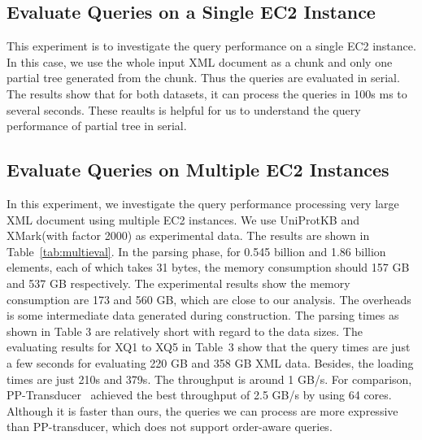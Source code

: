 \subsection{Evaluate Queries on a Single EC2 Instance}

This experiment is to investigate the query performance on a single EC2
instance. In this case, we use the whole input XML document as a chunk and only
one partial tree generated from the chunk. Thus the queries are evaluated in
serial. The results show that for both datasets, it can process the queries
in 100s ms to several seconds. These reaults is helpful for us to understand
the query performance of partial tree in serial.


\subsection{Evaluate Queries on Multiple EC2 Instances}

In this experiment, we investigate the query performance processing very large
XML document using multiple EC2 instances. We use UniProtKB and XMark(with
factor 2000) as experimental data. The results are shown in
Table~\ref{tab:multieval}. In the parsing phase, for 0.545 billion and 1.86
billion elements, each of which takes 31 bytes, the memory consumption should
157 GB and 537 GB respectively. The experimental results show the memory
consumption are 173 and 560 GB, which are close to our analysis.  The overheads
is some intermediate data generated during construction. The parsing times as
shown in Table 3 are relatively short with regard to the data sizes. The
evaluating results for XQ1 to XQ5 in Table~3 show that  the query times are just
a few seconds for evaluating 220 GB and 358 GB XML data.  Besides, the loading
times are just 210s and 379s.  The throughput is around 1 GB/s. For comparison,
PP-Transducer~\cite{OgTP13} achieved the best throughput of 2.5 GB/s by using 64
cores. Although it is faster than ours, the queries we can process are more
expressive than PP-transducer, which does not support order-aware queries.
